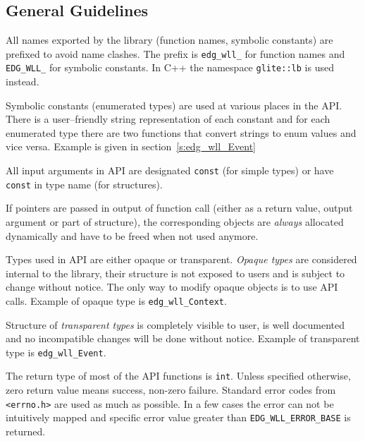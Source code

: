 \subsection{General Guidelines}

%
All names exported by the \LB library (function names, symbolic
constants) are prefixed to avoid name clashes. The prefix is
\lstinline'edg_wll_' for function names and \lstinline'EDG_WLL_' for
symbolic constants. In C++ the namespace \lstinline'glite::lb' is used
instead.

%
Symbolic constants (\ie enumerated types) are used at various places in the \LB
API. There is a user--friendly string representation of each
constant and for each enumerated type there are two functions that
convert strings to enum values and vice versa. Example is given in
section~\ref{s:edg_wll_Event}

%
All input arguments in \LB API are designated \verb'const' (for simple
types) or have \verb'const' in type name (for structures).

If pointers are passed in output of function call (either as a return
value, output argument or part of structure), the corresponding
objects are \emph{always} allocated dynamically and have to be freed
when not used anymore. 

%
Types used in \LB API are either opaque or transparent. \textit{Opaque
types} are considered internal to the library, their structure is not
exposed to users and is subject to change without notice. The only way
to modify opaque objects is to use API calls. Example of opaque type
is \lstinline'edg_wll_Context'.

Structure of \textit{transparent types} is completely visible to
user, is well documented and no incompatible changes will be done
without notice. Example of transparent type is
\lstinline'edg_wll_Event'.

%
The return type of most of the API functions is \lstinline'int'.
Unless specified otherwise, zero return value means success, non-zero
failure. Standard error codes from \lstinline'<errno.h>' are used as
much as possible. In a few cases the error can not be intuitively
mapped and \LB specific error value greater than
\lstinline'EDG_WLL_ERROR_BASE' is returned.


